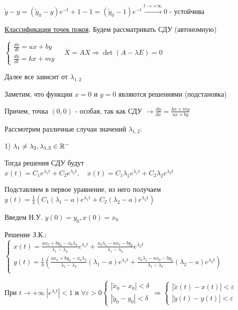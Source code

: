 \documentclass[12pt]{article}
\begin{document}
    $\tilde{y} - y = (\tilde{y}_0 - y) e^{-t} + 1 - 1 = (\tilde{y}_0 - 1)e^{-t} \stackrel{t \to +\infty}{\longrightarrow} 0$ - устойчива{\huge 🥳}



    \underline{Классификация точек покоя}. Будем рассматривать СДУ (автономную)

    $\begin{cases}\frac{dx}{dt} = ax + by \\ \frac{dy}{dt} = kx + my\end{cases} \quad
    \dot X = AX \Longrightarrow \det(A - \lambda E) = 0$

    Далее все зависит от $\lambda_{1,2}$

    Заметим, что функции $x = 0$ и $y = 0$ являются решениями (подстановка)

    Причем, точка $(0, 0)$ - особая, так как СДУ $\to \frac{dy}{dx} = \frac{kx + my}{ax + by}$

    Рассмотрим различные случаи значений $\lambda_{1,2}$:

    1) $\lambda_1 \neq \lambda_2, \lambda_{1,2} \in \mathbb{R}^-$

    Тогда решения СДУ будут $x(t) = C_1 e^{\lambda_1 t} + C_2 e^{\lambda_2 t}, \quad
    \dot x(t) = C_1 \lambda_1 e^{\lambda_1 t} + C_2 \lambda_2 e^{\lambda_2 t}$

    Подставляем в первое уравнение, из него получаем $y(t) = \frac{1}{b}(C_1 (\lambda_1 - a)e^{\lambda_1 t} + C_2 (\lambda_2 - a)e^{\lambda_2 t})$

    Введем Н.У. $y(0) = y_0, x(0) = x_0$

    Решение З.К.: $\begin{cases}x(t) = \frac{ax_0 + by_0 - x_0 \lambda_2}{\lambda_1 - \lambda_2} e^{\lambda_1 t} + \frac{x_0 \lambda_1 - ax_0 - by_0}{\lambda_1 - \lambda_2} e^{\lambda_2 t} \\
    y(t) = \frac{1}{b}(\frac{ax_0 + by_0 - x_0 \lambda_2}{\lambda_1 - \lambda_2} (\lambda_1 - a) e^{\lambda_1 t} + \frac{x_0 \lambda_1 - ax_0 - by_0}{\lambda_1 - \lambda_2} (\lambda_2 - a) e^{\lambda_2 t}) \\
    \end{cases}$

    При $t \to +\infty \ |e^{\lambda_i t}| < 1$ и $\forall \varepsilon > 0 \begin{cases}|\tilde{x}_0 - x_0| < \delta \\ |\tilde{y}_0 - y_0| < \delta\end{cases} \Longrightarrow
    \begin{cases}|\tilde{x}(t) - x(t)| < \varepsilon \\ |\tilde{y}(t) - y(t)| < \varepsilon\end{cases}$
\end{document}
